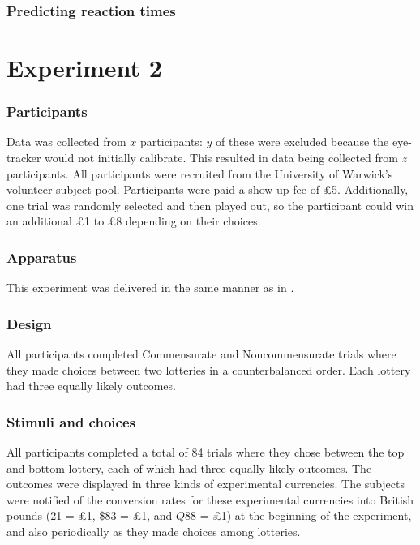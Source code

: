 \documentclass[doc, a4paper, apacite]{apa6}
\def\yenrule{\rule{1.3ex}{.1ex}}
\def\textyen{\renewcommand\stacktype{L}\stackon[.4ex]{\stackon[.65ex]{Y}{\yenrule}}{\yenrule}}
\begin{document}


\subsubsection{Predicting reaction times}

\section{Experiment 2} \label{exp:NS07}
\subsubsection{Participants}
Data was collected from $x$ participants: $y$ of these were excluded because the eye-tracker would not initially calibrate. This resulted in data being collected from $z$ participants. All participants were recruited from the University of Warwick's volunteer subject pool. Participants were paid a show up fee of \pounds 5. Additionally, one trial was randomly selected and then played out, so the participant could win an additional \pounds 1 to \pounds 8 depending on their choices. 

\subsubsection{Apparatus}
This experiment was delivered in the same manner as in . 

\subsubsection{Design}
All participants completed Commensurate and Noncommensurate trials where they made choices between two lotteries in a counterbalanced order. Each lottery had three equally likely outcomes.

\subsubsection{Stimuli and choices}
All participants completed a total of 84 trials where they chose between the top and bottom lottery, each of which had three equally likely outcomes. The outcomes were displayed in three kinds of experimental currencies. The subjects were notified of the conversion rates for these experimental currencies into British pounds (\textyen 21 = \pounds1, \$83 = \pounds 1, and $Q88$ = \pounds1) at the beginning of the experiment, and also periodically as they made choices among lotteries.
 
\end{document}
